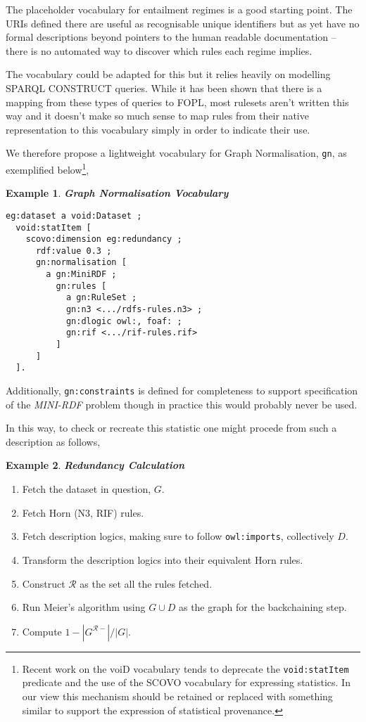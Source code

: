 \documentclass{article}
\newtheorem{example}{Example}
\begin{document}
The placeholder vocabulary for entailment regimes \cite{SWER10}
is a good starting point. The URIs defined there
are useful as recognisable unique identifiers but as yet have no
formal descriptions beyond pointers to the human readable 
documentation -- there is no automated way to discover which
rules each regime implies.

The \cite{SPIN09} vocabulary could be adapted for this but it
relies heavily on modelling SPARQL CONSTRUCT queries. While it 
has been shown \cite{SR07} that there is a mapping from these
types of queries to FOPL, most rulesets aren't written this 
way and it doesn't make so much sense to map rules from their
native representation to this vocabulary simply in order to
indicate their use.

We therefore propose a lightweight vocabulary \cite{GN10} for
Graph Normalisation, \texttt{gn}, as exemplified below\footnote{
  Recent work on the voiD vocabulary tends to deprecate the
  \texttt{void:statItem} predicate and the use of the SCOVO 
  vocabulary for expressing statistics. In our view this
  mechanism should be retained or replaced with something
  similar to support the expression of statistical provenance.
},
\smallskip
\begin{example}{\bf Graph Normalisation Vocabulary}

\begin{verbatim}
eg:dataset a void:Dataset ;
  void:statItem [ 
    scovo:dimension eg:redundancy ;
      rdf:value 0.3 ;
      gn:normalisation [
        a gn:MiniRDF ;
          gn:rules [
            a gn:RuleSet ;
            gn:n3 <.../rdfs-rules.n3> ;
            gn:dlogic owl:, foaf: ;
            gn:rif <.../rif-rules.rif>
          ]
      ]
  ].
\end{verbatim}
\end{example}

Additionally, \texttt{gn:constraints} is defined for completeness
to support specification of the {\em MINI-RDF} problem though in
practice this would probably never be used.

In this way, to check or recreate this statistic one
might procede from such a description as follows,

\begin{example}{\bf Redundancy Calculation}
\end{example}

\begin{enumerate}
  \item Fetch the dataset in question, $G$.
  \item Fetch Horn (N3, RIF) rules.
  \item Fetch description logics, making sure to follow
    \texttt{owl:imports}, collectively $D$.
  \item Transform the description logics into their equivalent
    Horn rules.
  \item Construct $\mathcal{R}$ as the set all the rules fetched.
  \item Run Meier's algorithm using $G \cup D$ as the graph for
    the backchaining step.
  \item Compute $1 - |G^{\mathcal{R}-}|/|G|$.
\end{enumerate}
\end{document}

